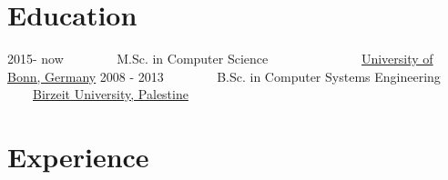 \documentclass[letterpaper]{twentysecondcv} %
\begin{document}
\makeprofile %

\section{Education}

\begin{twenty} %
	\twentyitem
    	{2015- now }
        { }
        {~~~~~~~ M.Sc.  in  Computer Science}        
        {~~~~~~~~~~~~~~\href{https://www.uni-bonn.de/}{University of Bonn, Germany}}
        {}
        {}
	\twentyitem
    	{2008 - 2013  }
		{}
        {~~~~~~~ B.Sc. in Computer Systems Engineering }       
        {~~~~\href{https://www.birzeit.edu/en}{Birzeit University,  Palestine}}
         {}
         {}
\end{twenty}




\section{Experience}
\end{document}
